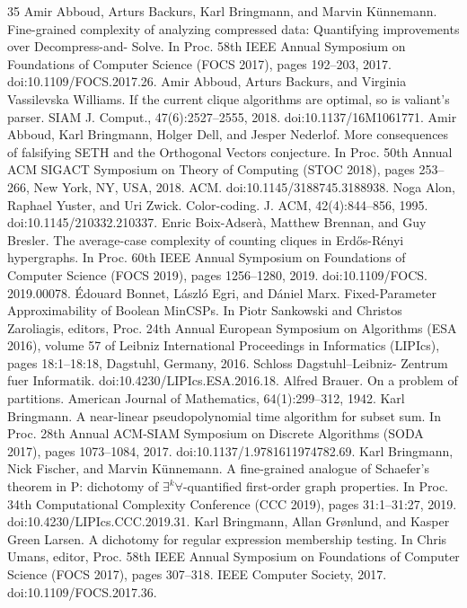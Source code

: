 \begin{thebibliography}{35}
Amir Abboud, Arturs Backurs, Karl Bringmann, and Marvin Künnemann. Fine-grained complexity of analyzing compressed data: Quantifying improvements over Decompress-and- Solve. In Proc. 58th IEEE Annual Symposium on Foundations of Computer Science (FOCS 2017), pages 192–203, 2017. doi:10.1109/FOCS.2017.26.
Amir Abboud, Arturs Backurs, and Virginia Vassilevska Williams. If the current clique algorithms are optimal, so is valiant’s parser. SIAM J. Comput., 47(6):2527–2555, 2018. doi:10.1137/16M1061771.
Amir Abboud, Karl Bringmann, Holger Dell, and Jesper Nederlof. More consequences of falsifying SETH and the Orthogonal Vectors conjecture. In Proc. 50th Annual ACM SIGACT Symposium on Theory of Computing (STOC 2018), pages 253–266, New York, NY, USA, 2018. ACM. doi:10.1145/3188745.3188938.
Noga Alon, Raphael Yuster, and Uri Zwick. Color-coding. J. ACM, 42(4):844–856, 1995. doi:10.1145/210332.210337.
Enric Boix-Adserà, Matthew Brennan, and Guy Bresler. The average-case complexity of counting cliques in Erdős-Rényi hypergraphs. In Proc. 60th IEEE Annual Symposium on Foundations of Computer Science (FOCS 2019), pages 1256–1280, 2019. doi:10.1109/FOCS. 2019.00078.
Édouard Bonnet, László Egri, and Dániel Marx. Fixed-Parameter Approximability of Boolean MinCSPs. In Piotr Sankowski and Christos Zaroliagis, editors, Proc. 24th Annual European Symposium on Algorithms (ESA 2016), volume 57 of Leibniz International Proceedings in Informatics (LIPIcs), pages 18:1–18:18, Dagstuhl, Germany, 2016. Schloss Dagstuhl–Leibniz- Zentrum fuer Informatik. doi:10.4230/LIPIcs.ESA.2016.18.
Alfred Brauer. On a problem of partitions. American Journal of Mathematics, 64(1):299–312, 1942.
Karl Bringmann. A near-linear pseudopolynomial time algorithm for subset sum. In Proc. 28th Annual ACM-SIAM Symposium on Discrete Algorithms (SODA 2017), pages 1073–1084, 2017. doi:10.1137/1.9781611974782.69.
Karl Bringmann, Nick Fischer, and Marvin Künnemann. A fine-grained analogue of Schaefer’s theorem in P: dichotomy of $\exists^k\forall$-quantified first-order graph properties. In Proc. 34th Computational Complexity Conference (CCC 2019), pages 31:1–31:27, 2019. doi:10.4230/LIPIcs.CCC.2019.31.
Karl Bringmann, Allan Grønlund, and Kasper Green Larsen. A dichotomy for regular expression membership testing. In Chris Umans, editor, Proc. 58th IEEE Annual Symposium on Foundations of Computer Science (FOCS 2017), pages 307–318. IEEE Computer Society, 2017. doi:10.1109/FOCS.2017.36.

\end{thebibliography}
